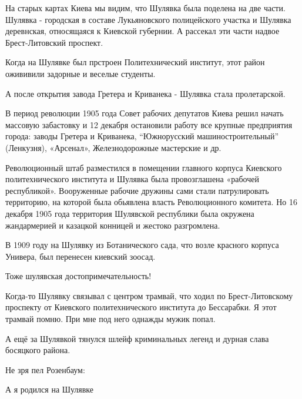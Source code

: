 
На старых картах Киева мы видим, что Шулявка была поделена на две части.
Шулявка - городская в составе Лукьяновского полицейского участка и Шулявка
деревнская, относящаяся к Киевской губернии. А рассекал эти части надвое
Брест-Литовский проспект.  



Когда на Шулявке был прстроен Политехнический институт, этот район ожививили
задорные и веселые студенты.

А после открытия завода Гретера и Криванека - Шулявка стала пролетарской.


В период революции 1905 года Совет рабочих депутатов Киева решил начать
массовую забастовку и 12 декабря остановили работу все крупные предприятия
города: заводы Гретера и Криванека, \enquote{Южнорусский машиностроительный} (Ленкузня),
«Арсенал», Железнодорожные мастерские и др.


Революционный штаб разместился в помещении главного корпуса Киевского
политехнического института и Шулявка была провозглашена «рабочей республикой».
Вооруженные рабочие дружины сами стали патрулировать территорию, на которой
была обьявлена власть Революционного комитета. Но 16 декабря 1905 года
территория Шулявской республики была окружена  жандармерией и казацкой конницей
и жестоко разгромлена. 


В 1909 году на Шулявку из Ботанического сада, что возле красного корпуса
Универа, был перенесен киевский зоосад. 

Тоже шулявская достопримечательность!


Когда-то Шулявку связывал с центром трамвай, что ходил по Брест-Литовскому
проспекту от Киевского политехнического института до Бессарабки. Я этот трамвай
помню. При мне под него однажды мужик попал.


А ещё за Шулявкой тянулся шлейф криминальных легенд и дурная слава босяцкого района.

Не зря пел Розенбаум:

А я родился на Шулявке

